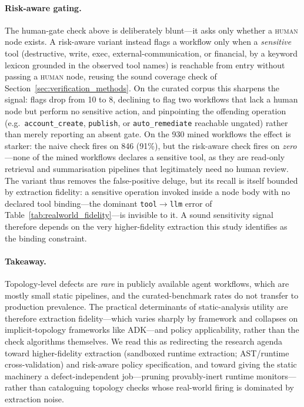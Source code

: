 \paragraph{Risk-aware gating.}
The human-gate check above is deliberately blunt---it asks only whether a
\textsc{human} node exists. A risk-aware variant instead flags a workflow only
when a \emph{sensitive} tool (destructive, write, exec, external-communication,
or financial, by a keyword lexicon grounded in the observed tool names) is
reachable from entry without passing a \textsc{human} node, reusing the sound
coverage check of Section~\ref{sec:verification_methods}. On the curated corpus
this sharpens the signal: flags drop from 10 to 8, declining to flag two
workflows that lack a human node but perform no sensitive action, and pinpointing
the offending operation (e.g.\ \texttt{account\_create}, \texttt{publish}, or
\texttt{auto\_remediate} reachable ungated) rather than merely reporting an absent
gate. On the 930 mined workflows the effect is starker: the naive check fires on
846 (91\%), but the risk-aware check fires on \emph{zero}---none of the mined
workflows declares a sensitive tool, as they are read-only retrieval and
summarisation pipelines that legitimately need no human review. The variant thus
removes the false-positive deluge, but its recall is itself bounded by extraction
fidelity: a sensitive operation invoked inside a node body with no declared tool
binding---the dominant \texttt{tool}$\rightarrow$\texttt{llm} error of
Table~\ref{tab:realworld_fidelity}---is invisible to it. A sound sensitivity
signal therefore depends on the very higher-fidelity extraction this study
identifies as the binding constraint.

\paragraph{Takeaway.}
Topology-level defects are \emph{rare} in publicly available agent workflows,
which are mostly small static pipelines, and the curated-benchmark rates do not
transfer to production prevalence. The practical determinants of static-analysis
utility are therefore extraction fidelity---which varies sharply by framework and
collapses on implicit-topology frameworks like ADK---and policy applicability,
rather than the check algorithms themselves. We read this as redirecting the
research agenda toward higher-fidelity extraction (sandboxed runtime extraction;
AST/runtime cross-validation) and risk-aware policy specification, and toward
giving the static machinery a defect-independent job---pruning provably-inert
runtime monitors---rather than cataloguing topology checks whose real-world
firing is dominated by extraction noise.
